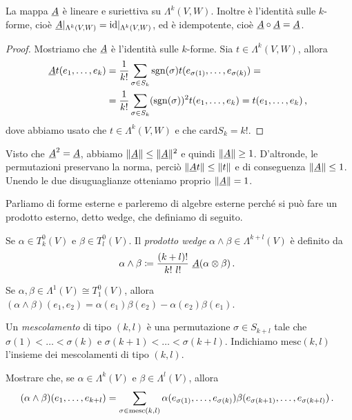 \begin{proposition}
	La mappa $\antisimm$ è lineare e suriettiva su $\Lambda^k(V,W)$. Inoltre è l'identità sulle $k$-forme, cioè $\antisimm\restrict{\Lambda^k(V,W)} = \id\restrict{\Lambda^k(V,W)}$, ed è idempotente, cioè $\antisimm \circ \antisimm = \antisimm$.
\end{proposition}
\begin{proof}
	Mostriamo che $\antisimm$ è l'identità sulle $k$-forme. Sia $t\in\Lambda^k(V,W)$, allora
	\begin{align*}
		\antisimm t(\seqb{e}{k}{,}) &= \frac 1 {k!} \sum_{\sigma \in S_k} \sgn (\sigma) t(e_{\sigma(1)},\ldots, e_{\sigma(k)}) =\\
		& = \frac 1 {k!} \sum_{\sigma \in S_k} (\sgn (\sigma))^2 t(\seqb{e}{k}{,}) = t (\seqb{e}{k}{,}) \virgola
	\end{align*}
	dove abbiamo usato che $t\in\Lambda^k(V,W)$ e che $\mathrm{card} S_k = k!$.
\end{proof}

\begin{remark}
	Visto che $\antisimm^2=\antisimm$, abbiamo $\norm\antisimm \le \norm\antisimm^2$ e quindi $\norm\antisimm \ge 1 $.
	D'altronde, le permutazioni preservano la norma, perciò $\norm{\antisimm t} \le \norm{t}$ e di conseguenza $\norm \antisimm \le 1$.
	Unendo le due disuguaglianze otteniamo proprio $\norm\antisimm = 1$.
\end{remark}

Parliamo di forme esterne e parleremo di algebre esterne perché si può fare un prodotto esterno, detto wedge, che definiamo di seguito.

\begin{definition} 
	Se $\alpha \in T^0_k(V)$ e $\beta \in T^0_l(V)$. Il \emph{prodotto wedge} $\alpha \wedge \beta \in \Lambda^{k+l}(V)$ è definito da
	\begin{equation*}
		\alpha\wedge \beta \coloneqq \frac {(k+l)!}{k!\ l!}\ \antisimm(\alpha\otimes \beta)\punto
	\end{equation*}
\end{definition}

\begin{example}
	Se $\alpha,\beta\in\Lambda^1(V) \cong T^0_1(V)$, allora $(\alpha\wedge \beta)(e_1,e_2) = \alpha(e_1)\beta(e_2) - \alpha(e_2)\beta(e_1)$.
\end{example}

\begin{exercise} 
	Un \emph{mescolamento} di tipo $(k,l)$ è una permutazione $\sigma \in S_{k+l}$ tale che $\sigma(1) < \ldots < \sigma(k)$ e $\sigma(k+1) <\ldots < \sigma(k+l)$.
	Indichiamo $\mathrm{mesc} (k,l)$ l'insieme dei mescolamenti di tipo $(k,l)$.
	
	Mostrare che, se $\alpha\in\Lambda^k(V)$ e $\beta\in\Lambda^l(V)$, allora
	\begin{equation*}
	(\alpha\wedge\beta)(\seqb{e}{k+l}{,}) = \sum_{\sigma \in \mathrm{mesc}(k,l)} \alpha(e_{\sigma(1)},\ldots,e_{\sigma(k)}) \beta(e_{\sigma(k+1)},\ldots,e_{\sigma(k+l)})\punto
	\end{equation*}
\end{exercise}

